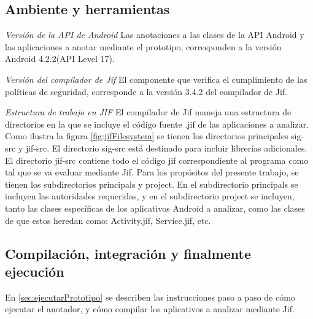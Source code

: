 \subsection{Ambiente y herramientas}
\textit{Versión de la API de Android}\newline
Las anotaciones a las clases de la API Android y las aplicaciones a anotar
mediante el prototipo, corresponden a la versión Android 4.2.2(API Level 17).

\textit{Versión del compilador de Jif}\newline
El componente que verifica el cumplimiento de las políticas de seguridad,
corresponde a la versión 3.4.2 del compilador de Jif.

\textit{Estructura de trabajo en JIF}\newline
El compilador de Jif maneja una estructura de directorios en la que se incluye
el código fuente .jif de las aplicaciones a analizar. Como ilustra la figura
\ref{fig:jifFilesystem} se tienen los directorios principales sig-src y jif-src.
El directorio sig-src está destinado para incluir librerías adicionales.\newline 
El directorio jif-src contiene todo el código jif correspondiente al programa
como tal que se va evaluar mediante Jif. Para los propósitos del presente
trabajo, se tienen los subdirectorios principals y project. En el subdirectorio
principals se incluyen las autoridades requeridas, y en el subdirectorio
project se incluyen, tanto las clases específicas de los aplicativos Android a
analizar, como las clases de que estos heredan como: Activity.jif, Service.jif,
etc.

\subsection{Compilación, integración y finalmente ejecución }
En \ref{sec:ejecutarPrototipo} se describen las instrucciones paso a paso de cómo
ejecutar el anotador, y cómo compilar los aplicativos a analizar mediante Jif.





















